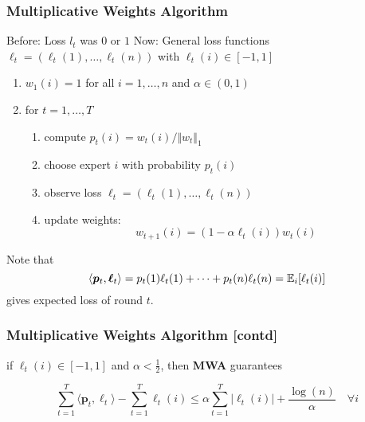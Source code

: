 \documentclass{beamer}
\begin{document}
\begin{frame}
  \frametitle{Multiplicative Weights Algorithm}
  Before: Loss $l_t$ was $0$ or $1$
  Now: General loss functions $\bm{\ell}_t= (\ell_t(1), \dots, \ell_t(n))$ with $\ell_t(i) \in [-1, 1]$
  \begin{enumerate}
    \item $w_1(i) = 1$ for all $i = 1, \dots, n$ and $\alpha \in (0, 1)$
    \item for $t=1, \dots, T$
      \begin{enumerate}
        \item compute $p_t(i) = w_t(i)/\Vert w_t \Vert_1$
        \item choose expert $i$ with probability $p_t(i)$
        \item observe loss $\bm{\ell}_t= (\ell_t(1), \dots, \ell_t(n))$
        \item update weights:
          \begin{equation}
            w_{t+1}(i) = (1-\alpha \ell_t(i)) w_t(i)
          \end{equation}
      \end{enumerate}
  \end{enumerate}

  Note that
  \begin{equation}
    \langle \bm{p}_t, \bm{\ell}_t \rangle = p_t(1)\ell_t(1) + \cdots + p_t(n)\ell_t(n) = \mathbb{E}_i[\ell_t(i)]
  \end{equation}
  gives expected loss of round $t$.
\end{frame}

\begin{frame}
  \frametitle{Multiplicative Weights Algorithm [contd]}

  \begin{theorem}
    if $\ell_t(i) \in [-1, 1]$ and $\alpha < \frac12$, then \textbf{MWA} guarantees

    \begin{equation}
      \sum_{t=1}^{T} \langle \bm{p}_t, \bm{\ell}_t \rangle  - \sum_{t=1}^{T} \ell_t(i) \le \alpha \sum_{t=1}^{T} \vert \ell_t(i) \vert + \frac{\log(n)}{\alpha} \quad \forall i
    \end{equation}

  \end{theorem}

\end{frame}
\end{document}
